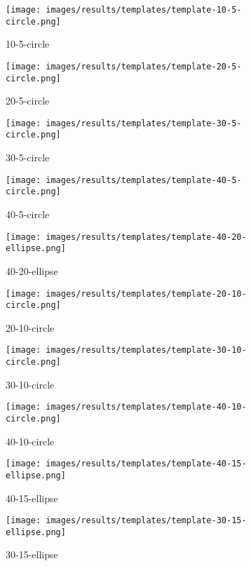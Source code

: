 \begin{figure}[H]
    \centering

\begin{subfigure}{.25\textwidth}
    \centering
    \texttt{[image: images/results/templates/template-10-5-circle.png]}
    \caption{10-5-circle}
\end{subfigure}%
\begin{subfigure}{.25\textwidth}
\centering
    \texttt{[image: images/results/templates/template-20-5-circle.png]}
    \caption{20-5-circle}
\end{subfigure}%
\begin{subfigure}{.25\textwidth}
\centering
    \texttt{[image: images/results/templates/template-30-5-circle.png]}
    \caption{30-5-circle}
\end{subfigure}%
\begin{subfigure}{.25\textwidth}
\centering
    \texttt{[image: images/results/templates/template-40-5-circle.png]}
    \caption{40-5-circle}
\end{subfigure}
\begin{subfigure}{.25\textwidth}
\centering
    \texttt{[image: images/results/templates/template-40-20-ellipse.png]}
    \caption{40-20-ellipse}
\end{subfigure}%
\begin{subfigure}{.25\textwidth}
\centering
    \texttt{[image: images/results/templates/template-20-10-circle.png]}
    \caption{20-10-circle}
\end{subfigure}%
\begin{subfigure}{.25\textwidth}
\centering
    \texttt{[image: images/results/templates/template-30-10-circle.png]}
    \caption{30-10-circle}
\end{subfigure}%
\begin{subfigure}{.25\textwidth}
\centering
    \texttt{[image: images/results/templates/template-40-10-circle.png]}
    \caption{40-10-circle}
\end{subfigure}
\begin{subfigure}{.25\textwidth}
\centering
    \texttt{[image: images/results/templates/template-40-15-ellipse.png]}
    \caption{40-15-ellipse}
\end{subfigure}%
\begin{subfigure}{.25\textwidth}
\centering
    \texttt{[image: images/results/templates/template-30-15-ellipse.png]}
    \caption{30-15-ellipse}
\end{subfigure}%
\begin{subfigure}{.25\textwidth}
\centering

\end{subfigure}
\end{figure}
